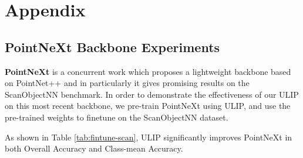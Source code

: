 \documentclass[10pt,twocolumn,letterpaper]{article}
\begin{document}





{\small


}

\clearpage

\appendix

\section{Appendix}
\label{sec:appendix}

\subsection{PointNeXt Backbone Experiments}
\noindent\textbf{PointNeXt}\cite{qian2022pointnext} is a concurrent work which proposes a lightweight backbone based on PointNet++ and in particularly it gives promising results on the ScanObjectNN benchmark. In order to demonstrate the effectiveness of our ULIP on this most recent backbone, we pre-train PointNeXt using ULIP, and use the pre-trained weights to finetune on the ScanObjectNN dataset.

As shown in Table \ref{tab:fintune-scan}, ULIP significantly improves PointNeXt in both Overall Accuracy and Class-mean Accuracy.
\end{document}
